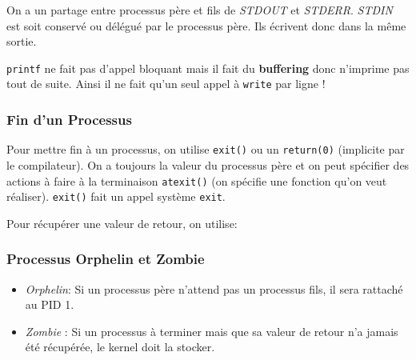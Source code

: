 On a un partage entre processus père et fils de \emph{STDOUT} et
\emph{STDERR}. \emph{STDIN} est soit conservé ou délégué par le
processus père. Ils écrivent donc dans la même sortie.

\texttt{printf} ne fait pas d'appel bloquant mais il fait du
\textbf{buffering} donc n'imprime pas tout de suite. Ainsi il ne fait
qu'un seul appel à \texttt{write} par ligne !

\subsubsection{Fin d'un Processus}\label{fin-dun-processus}

Pour mettre fin à un processus, on utilise \texttt{exit()} ou un
\texttt{return(0)} (implicite par le compilateur). On a toujours la
valeur du processus père et on peut spécifier des actions à faire à la
terminaison \texttt{atexit()} (on spécifie une fonction qu'on veut
réaliser). \texttt{exit()} fait un appel système \texttt{exit}.

Pour récupérer une valeur de retour, on utilise:

\begin{Shaded}
\begin{Highlighting}[]
\PreprocessorTok{ }

\OperatorTok{(}\OperatorTok{,}  \OperatorTok{*}\OperatorTok{,} \OperatorTok{);}
\end{Highlighting}
\end{Shaded}

\subsubsection{Processus Orphelin et
Zombie}\label{processus-orphelin-et-zombie}

\begin{itemize}
\tightlist
\item
  \emph{Orphelin}: Si un processus père n'attend pas un processus fils,
  il sera rattaché au PID 1.
\item
  \emph{Zombie} : Si un processus à terminer mais que sa valeur de
  retour n'a jamais été récupérée, le kernel doit la stocker.
\end{itemize}

